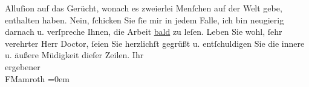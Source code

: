 \begin{ledgroupsized}[t]{13cm}
               Alluſion {\pb}auf das Gerücht, wonach es
               zweierlei Menſchen auf der Welt gebe, enthalten haben. Nein, ſchicken Sie ſie mir in
               jedem Falle, ich bin neugierig darnach u. verſpreche Ihnen, die Arbeit \uline{bald} zu leſen.\pend
           \pstart
           Leben Sie wohl, ſehr verehrter Herr Doctor, ſeien Sie herzlichſt gegrüßt u.
               entſchuldigen Sie die innere u. äußere Müdigkeit dieſer Zeilen.\pend
           \pstart
           Ihr{\\[\baselineskip]}ergebener{\\[\baselineskip]}\spacefill\mbox{FMamroth}\pend
           \leftskip=0em{}
         
         \endnumbering{}\end{ledgroupsized}  \newcommand{\dateiname}{L00135}\newcommand{\titel}{Fedor Mamroth an Arthur Schnitzler, 17. 11. 1892}\newcommand{\editorInnen}{Martin Anton Müller und Gerd-Hermann Susen}
      